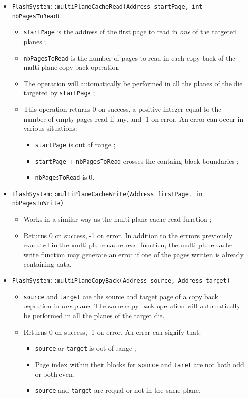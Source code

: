 \begin{itemize}
  \item \verb+FlashSystem::multiPlaneCacheRead(Address startPage, int nbPagesToRead)+
  \begin{itemize}
    \item \verb+startPage+ is the address of the first page to read in \emph{one} of the targeted planes ;
    \item \verb+nbPagesToRead+ is the number of pages to read in each copy back of the multi plane copy back operation
    \item The operation will automatically be performed in all the planes of the die targeted by \verb+startPage+ ;
    \item This operation returns 0 on success, a positive integer equal to the number of empty pages read if any, and -1 on error. An error can occur in various situations:
    \begin{itemize}
      \item \verb+startPage+ is out of range ;
      \item \verb+startPage+ + \verb+nbPagesToRead+ crosses the containg block boundaries ;
      \item \verb+nbPagesToRead+ is 0.
    \end{itemize}
  \end{itemize}
  
  \item \verb+FlashSystem::multiPlaneCacheWrite(Address firstPage, int nbPagesToWrite)+
  \begin{itemize}
    \item Works in a similar way as the multi plane cache read function ;
    \item Returns 0 on success, -1 on error. In addition to the errrors previously evocated in the multi plane cache read function, the multi plane cache write function may generate an error if one of the pages written is already containing data.
  \end{itemize}
  
  \item \verb+FlashSystem::multiPlaneCopyBack(Address source, Address target)+
  \begin{itemize}
    \item \verb+source+ and \verb+target+ are the source and target page of a copy back oepration in \emph{one} plane. The same copy back operation will automatically be performed in all the planes of the target die.
    \item Returns 0 on success, -1 on error. An error can signify that:
    \begin{itemize}
      \item \verb+source+ or \verb+target+ is out of range ;
      \item Page index within their blocks for \verb+source+ and \verb+taret+ are not both odd or both even.
      \item \verb+source+ and \verb+target+ are requal or not in the same plane.
    \end{itemize}
    
  \end{itemize}
\end{itemize}

